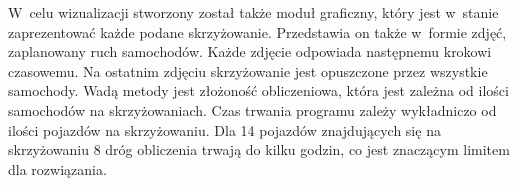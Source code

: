 \newline
\indent
W~celu wizualizacji stworzony został także moduł graficzny, który jest w~stanie zaprezentować każde podane skrzyżowanie. Przedstawia on także w~formie zdjęć, zaplanowany ruch samochodów. Każde zdjęcie odpowiada następnemu krokowi czasowemu. Na ostatnim zdjęciu skrzyżowanie jest opuszczone przez wszystkie samochody.
\newline
\indent
Wadą metody jest złożoność obliczeniowa, która jest zależna od ilości samochodów na skrzyżowaniach. Czas trwania programu zależy wykładniczo od ilości pojazdów na skrzyżowaniu. Dla 14 pojazdów znajdujących się na skrzyżowaniu 8 dróg obliczenia trwają do kilku godzin, co jest znaczącym limitem dla rozwiązania.

